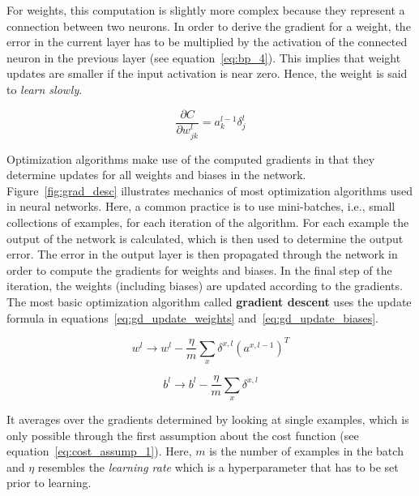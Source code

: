 For weights, this computation is slightly more complex because they represent
a connection between two neurons.
In order to derive the gradient for a weight, the error in the current layer
has to be multiplied by the activation of the connected neuron in the previous
layer (see equation~\ref{eq:bp_4}).
This implies that weight updates are smaller if the input activation is near
zero.
Hence, the weight is said to \textit{learn slowly}.

\begin{equation}
  \label{eq:bp_4}
  \frac{\partial C}{\partial w_{jk}^l} = a_k^{l-1} \delta_j^l
\end{equation}

Optimization algorithms make use of the computed gradients in that they determine
updates for all weights and biases in the network.
Figure~\ref{fig:grad_desc} illustrates mechanics of most optimization
algorithms used in neural networks.
Here, a common practice is to use mini-batches, i.e., small collections of
examples, for each iteration of the algorithm.
For each example the output of the network is calculated, which is then used
to determine the output error. 
The error in the output layer is then propagated through the network in order
to compute the gradients for weights and biases.
In the final step of the iteration, the weights (including biases) are updated
according to the gradients.
The most basic optimization algorithm called \textbf{gradient descent} uses the
update formula in equations~\ref{eq:gd_update_weights} and~\ref{eq:gd_update_biases}.

\begin{equation}
  \label{eq:gd_update_weights}
  w^l \rightarrow w^l - \frac{\eta}{m} \sum_x \delta^{x,l}{(a^{x,l-1})}^T
\end{equation}

\begin{equation}
  \label{eq:gd_update_biases}
  b^l \rightarrow b^l - \frac{\eta}{m} \sum_x \delta^{x,l}
\end{equation}

It averages over the gradients determined by looking at single examples, which
is only possible through the first assumption about the cost function (see equation~\ref{eq:cost_assump_1}).
Here, $m$ is the number of examples in the batch and $\eta$ resembles the
\textit{learning rate} which is a hyperparameter that has to be set prior to
learning.

